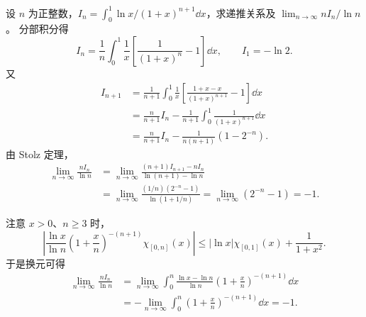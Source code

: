 设 $n$ 为正整数，$I_n=\int_0^1\ln x/(1+x)^{n+1}\dd x$，求递推关系及 $\lim_{n\to\infty}nI_n/\ln n$。
\sol 分部积分得
\[
I_n=\frac1n\int_0^1\frac1x\left[\frac1{(1+x)^n}-1\right]\dd x,
\qquad I_1=-\ln2.
\]
又
\begin{align*}
I_{n+1}&=\frac1{n+1}\int_0^1\frac1x\left[\frac{1+x-x}{(1+x)^{n+1}}-1\right]\dd x\\
&=\frac n{n+1}I_n-\frac1{n+1}\int_0^1\frac1{(1+x)^{n+1}}\dd x\\
&=\frac n{n+1}I_n-\frac1{n(n+1)}(1-2^{-n}).
\end{align*}
由 Stolz 定理，
\begin{align*}
\lim_{n\to\infty}\frac{nI_n}{\ln n}
&=\lim_{n\to\infty}\frac{(n+1)I_{n+1}-nI_n}{\ln(n+1)-\ln n}\\
&=\lim_{n\to\infty}\frac{(1/n)(2^{-n}-1)}{\ln(1+1/n)}
=\lim_{n\to\infty}(2^{-n}-1)=-1.
\end{align*}

注意 $x>0$、$n\ge3$ 时，
\[
\left|\frac{\ln x}{\ln n}\left(1+\frac xn\right)^{-(n+1)}\chi_{[0,n]}(x)\right|
\le|\ln x|\chi_{[0,1]}(x)+\frac1{1+x^2}.
\]
于是换元可得
\begin{align*}
\lim_{n\to\infty}\frac{nI_n}{\ln n}
&=\lim_{n\to\infty}\int_0^n\frac{\ln x-\ln n}{\ln n}\left(1+\frac xn\right)^{-(n+1)}\dd x\\
&=-\lim_{n\to\infty}\int_0^n\left(1+\frac xn\right)^{-(n+1)}\dd x=-1.
\end{align*}
